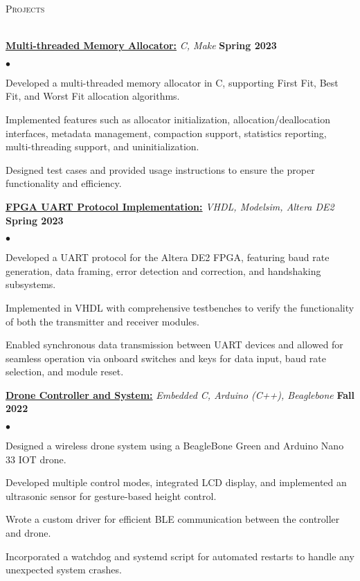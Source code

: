 \documentclass[a4paper]{article}
\newcommand{\lineunder} {
    \vspace*{-8pt} \\
    \hspace*{-18pt} \hrulefill\\
}
\newcommand{\header} [1] {
    {\hspace*{-18pt}\vspace*{6pt} \textsc{#1}}
    \vspace*{-6pt} \lineunder{}
}
\newenvironment{achievements}{
    \begin{list}{$\bullet$}{
        \setlength{\topsep}{0pt}
        \setlength{\itemsep}{-1pt}
        \setlength{\parskip}{0pt}
        \setlength{\parsep}{0pt}
        \setlength{\partopsep}{0pt}}
    }{
    \end{list}
}
\begin{document}
    \header{Projects}
    \href{https://github.com/SatireSage/Multi-threaded-Memory-Allocator}{\textbf{Multi-threaded Memory Allocator:}} {\sl C, Make\/} \hfill \textbf{Spring 2023}
    \begin{achievements}
        \item Developed a multi-threaded memory allocator in C, supporting First Fit, Best Fit, and Worst Fit allocation algorithms.
        \item Implemented features such as allocator initialization, allocation/deallocation interfaces, metadata management, compaction support, statistics reporting, multi-threading support, and uninitialization.
        \item Designed test cases and provided usage instructions to ensure the proper functionality and efficiency.
    \end{achievements}
    \vspace*{5pt}
    \href{https://github.com/SatireSage/FPGA-UART-Protocol}{\textbf{FPGA UART Protocol Implementation:}} {\sl VHDL, Modelsim, Altera DE2\/} \hfill \textbf{Spring 2023}
    \begin{achievements}
        \item Developed a UART protocol for the Altera DE2 FPGA, featuring baud rate generation, data framing, error detection and correction, and handshaking subsystems.
        \item Implemented in VHDL with comprehensive testbenches to verify the functionality of both the transmitter and receiver modules.
        \item Enabled synchronous data transmission between UART devices and allowed for seamless operation via onboard switches and keys for data input, baud rate selection, and module reset.
    \end{achievements}
    \vspace*{5pt}
    \href{https://github.com/SatireSage/Dronee}{\textbf{Drone Controller and System:}} {\sl Embedded C, Arduino (C++), Beaglebone\/} \hfill \textbf{Fall 2022}
    \begin{achievements}
        \item Designed a wireless drone system using a BeagleBone Green and Arduino Nano 33 IOT drone.
        \item Developed multiple control modes, integrated LCD display, and implemented an ultrasonic sensor for gesture-based height control.
        \item Wrote a custom driver for efficient BLE communication between the controller and drone.
        \item Incorporated a watchdog and systemd script for automated restarts to handle any unexpected system crashes.
    \end{achievements}
\end{document}
